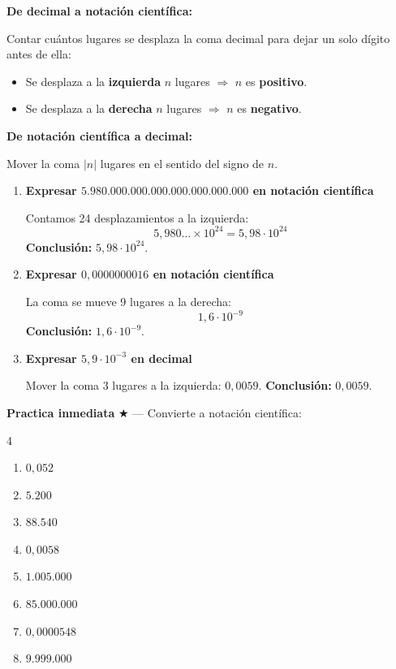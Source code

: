 \documentclass[11pt, letterpaper]{article}
\begin{document}
\begin{tcolorbox}[importantbox, title={Técnica de conversión}]
\textbf{De decimal a notación científica:}

Contar cuántos lugares se desplaza la coma decimal para dejar un solo dígito antes de ella:
\begin{itemize}[itemsep=3pt]
  \item Se desplaza a la \textbf{izquierda} $n$ lugares $\Rightarrow$ $n$ es \textbf{positivo}.
  \item Se desplaza a la \textbf{derecha} $n$ lugares $\Rightarrow$ $n$ es \textbf{negativo}.
\end{itemize}

\textbf{De notación científica a decimal:}

Mover la coma $|n|$ lugares en el sentido del signo de $n$.
\end{tcolorbox}

\begin{tcolorbox}[examplebox, title={Ejemplos — conversión}]
\begin{enumerate}[label=\textbf{Ej. \arabic*.}, leftmargin=*, itemsep=12pt]

\item \textbf{Expresar $5.980.000.000.000.000.000.000.000$ en notación científica}

Contamos 24 desplazamientos a la izquierda:
$$5{,}980\ldots \times 10^{24} = 5{,}98\cdot 10^{24}$$
\textbf{Conclusión:} $5{,}98\cdot 10^{24}$.

\item \textbf{Expresar $0{,}0000000016$ en notación científica}

La coma se mueve 9 lugares a la derecha:
$$1{,}6\cdot 10^{-9}$$
\textbf{Conclusión:} $1{,}6\cdot 10^{-9}$.

\item \textbf{Expresar $5{,}9\cdot 10^{-3}$ en decimal}

Mover la coma 3 lugares a la izquierda: $0{,}0059$.
\textbf{Conclusión:} $0{,}0059$.

\end{enumerate}
\end{tcolorbox}

\medskip
\textbf{Practica inmediata} \quad $\bigstar$ — Convierte a notación científica:
\begin{multicols}{4}
\begin{enumerate}[label=\alph*), leftmargin=*]
  \item $0{,}052$
  \item $5.200$
  \item $88.540$
  \item $0{,}0058$
  \item $1.005.000$
  \item $85.000.000$
  \item $0{,}0000548$
  \item $9.999.000$
\end{enumerate}
\end{multicols}
\end{document}
